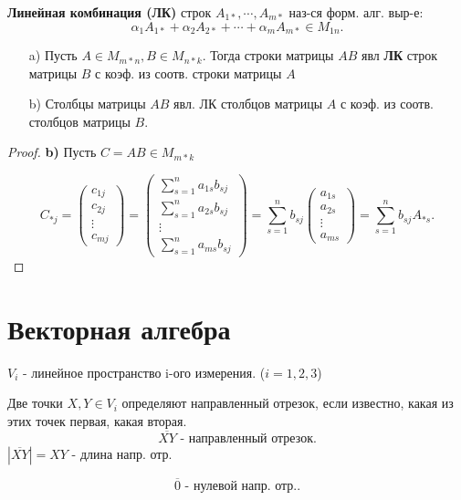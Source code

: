  \begin{definition}
     \textbf{Линейная комбинация (ЛК)} строк $A_{1*}, \cdots , A_{m*}$ наз-ся форм. алг. выр-е:
 \[
 \alpha_1 A_{1*} + \alpha_2 A_{2*} + \cdots + \alpha_m A_{m*}  \in M_{1n}
 .\] 
 \end{definition}

 \begin{statement}
     \begin{itemize}
         \item [a) ]  Пусть $A  \in M_{m*n}, B \in M_{n*k}$. Тогда строки матрицы $AB$ явл \textbf{ЛК} строк матрицы $B$ с коэф. из соотв. строки матрицы $A$
         \item [b) ] Столбцы матрицы $AB$ явл. ЛК столбцов матрицы $A$ с коэф. из соотв. столбцов матрицы $B$. 
     \end{itemize}

 \end{statement}
 \begin{proof}
 \textbf{b) } Пусть $C = AB  \in M_{m*k}$

  \[
      C_{*j} = \begin{pmatrix}c_{1j} \\ c_{2j} \\ \vdots \\ c_{mj}\end{pmatrix} = \begin{pmatrix} \sum_{s = 1}^{n} a_{1s}b_{sj} \\ \sum_{s = 1}^{n}  a_{2s} b_{sj} \\ \vdots \\ \sum_{s = 1}^{n} a_{ms}b_{sj}  \end{pmatrix} = \sum_{s = 1}^{n} b_{sj} \begin{pmatrix}a_{1s} \\ a_{2s} \\ \vdots \\ a_{ms} \end{pmatrix} = \sum_{s = 1}^{n}  b_{sj} A_{*s}
  .\] 
 \end{proof}
 
 \section{Векторная алгебра}
 
$V_i$ - линейное пространство  i-ого измерения. ($i = 1, 2, 3$)

\begin{definition}
Две точки $X, Y \in V_i$ определяют направленный отрезок, если известно, какая из этих точек первая, какая вторая.
\[
\overline{XY} \text{ - направленный отрезок}
.\] 
$|\overline{XY}| = XY$ - длина напр. отр.
\end{definition}
\begin{symb}
\[
\overline{0} \text{ - нулевой напр. отр.}
.\] 
\end{symb}

